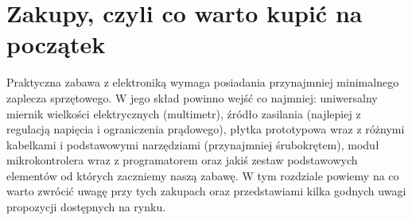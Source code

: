 % 
% 
% 
% 

\section{Zakupy, czyli co warto kupić na początek}

Praktyczna zabawa z elektroniką wymaga posiadania przynajmniej minimalnego zaplecza sprzętowego.
W jego skład powinno wejść co najmniej:
	uniwersalny miernik wielkości elektrycznych (multimetr),
	źródło zasilania (najlepiej z regulacją napięcia i ograniczenia prądowego),
	płytka prototypowa wraz z różnymi kabelkami i podstawowymi narzędziami (przynajmniej śrubokrętem),
	moduł mikrokontrolera wraz z programatorem
	oraz jakiś zestaw podstawowych elementów od których zaczniemy naszą zabawę.
W tym rozdziale powiemy na co warto zwrócić uwagę przy tych zakupach oraz przedstawiami kilka godnych uwagi propozycji dostępnych na rynku.

